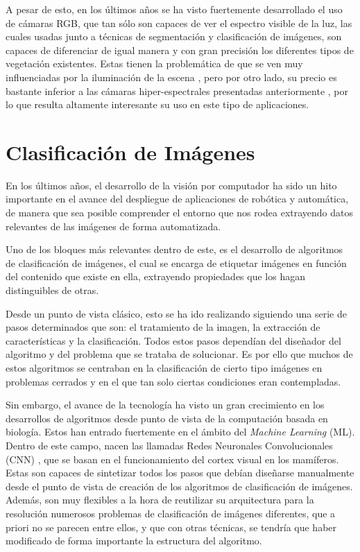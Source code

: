 A pesar de esto, en los últimos años se ha visto fuertemente desarrollado el uso de cámaras RGB, que tan sólo son capaces de ver el espectro visible de la luz, las cuales usadas junto a técnicas de segmentación y clasificación de imágenes, son capaces de diferenciar de igual manera y con gran precisión los diferentes tipos de vegetación existentes. Estas tienen la problemática de que se ven muy influenciadas por la iluminación de la escena \cite{Lameski2017}, pero por otro lado, su precio es bastante inferior a las cámaras hiper-espectrales presentadas anteriormente \cite{Gasparovic2020}, por lo que resulta altamente interesante su uso en este tipo de aplicaciones.

\section{Clasificación de Imágenes}

En los últimos años, el desarrollo de la visión por computador ha sido un hito importante en el avance del despliegue de aplicaciones de robótica y automática, de manera que sea posible comprender el entorno que nos rodea extrayendo datos relevantes de las imágenes de forma automatizada.

Uno de los bloques más relevantes dentro de este, es el desarrollo de algoritmos de clasificación de imágenes, el cual se encarga de etiquetar imágenes en función del contenido que existe en ella, extrayendo propiedades que los hagan distinguibles de otras.

Desde un punto de vista clásico, esto se ha ido realizando siguiendo una serie de pasos determinados que son: el tratamiento de la imagen, la extracción de características y la clasificación. Todos estos pasos dependían del diseñador del algoritmo y del problema que se trataba de solucionar. Es por ello que muchos de estos algoritmos se centraban en la clasificación de cierto tipo imágenes en problemas cerrados y en el que tan solo ciertas condiciones eran contempladas.

Sin embargo, el avance de la tecnología ha visto un gran crecimiento en los desarrollos de algoritmos desde punto de vista de la computación basada en biología. Estos han entrado fuertemente en el ámbito del \textit{Machine Learning} (ML). Dentro de este campo, nacen las llamadas Redes Neuronales Convolucionales (CNN) \cite{Alzubaidi2021}, que se basan en el funcionamiento del cortex visual en los mamíferos. Estas son capaces de sintetizar todos los pasos que debían diseñarse manualmente desde el punto de vista de creación de los algoritmos de clasificación de imágenes. Además, son muy flexibles a la hora de reutilizar su arquitectura para la resolución numerosos problemas de clasificación de imágenes diferentes, que a priori no se parecen entre ellos, y que con otras técnicas, se tendría que haber modificado de forma importante la estructura del algoritmo.

